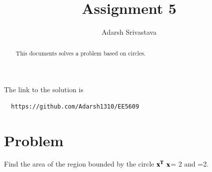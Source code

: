 \documentclass[journal,12pt,twocolumn]{IEEEtran}
\begin{document}
      \def\rightbox#1{\makebox[0in][r]{#1}}
      \def\centbox#1{\makebox[0in]{#1}}
      \def\topbox#1{\raisebox{-\baselineskip}[0in][0in]{#1}}
      \def\midbox#1{\raisebox{-0.5\baselineskip}[0in][0in]{#1}}
 \vspace{3cm}
 \title{Assignment 5}
 \author{Adarsh Srivastava}
 \maketitle
 \newpage
 \bigskip
 \renewcommand{\thetable}{\theenumi}
 The link to the solution is
 \begin{lstlisting}
  https://github.com/Adarsh1310/EE5609
 \end{lstlisting}
 \begin{abstract}
 This documents solves a problem based on circles.
 \end{abstract}
 \section{\textbf{Problem}}
Find the area of the region bounded by the circle $\bf{x}^{T}$ $\bf{x}$= 2 and =2.
\end{document}
